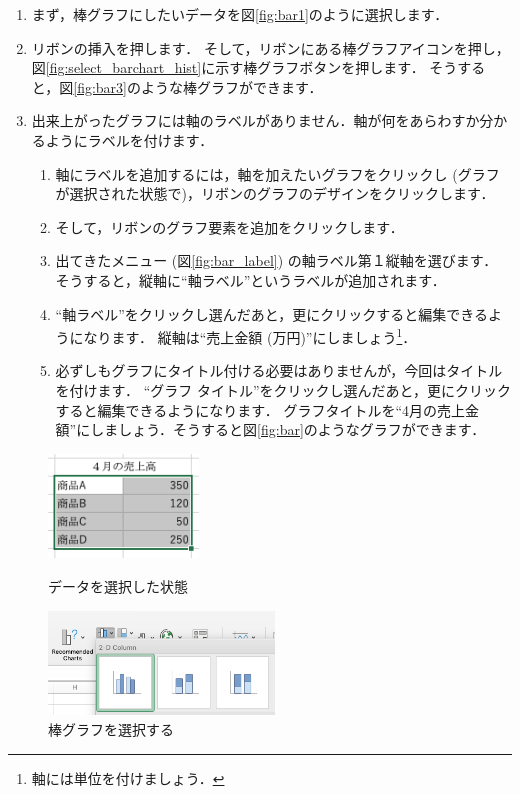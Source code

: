 \begin{enumerate}
    \item まず，棒グラフにしたいデータを図\ref{fig:bar1}のように選択します．
    \item リボンの挿入を押します．
    そして，リボンにある棒グラフアイコンを押し，図\ref{fig:select_barchart_hist}に示す棒グラフボタンを押します．
    そうすると，図\ref{fig:bar3}のような棒グラフができます．
    \item 出来上がったグラフには軸のラベルがありません．軸が何をあらわすか分かるようにラベルを付けます．
    \begin{enumerate}
        \item 軸にラベルを追加するには，軸を加えたいグラフをクリックし (グラフが選択された状態で)，リボンのグラフのデザインをクリックします．
        \item そして，リボンのグラフ要素を追加をクリックします．
        \item 出てきたメニュー (図\ref{fig:bar_label}) の軸ラベル第１縦軸を選びます．
        そうすると，縦軸に``軸ラベル''というラベルが追加されます．
        \item ``軸ラベル''をクリックし選んだあと，更にクリックすると編集できるようになります．
        縦軸は``売上金額 (万円)''にしましょう\footnote{軸には単位を付けましょう．}．
        \item 必ずしもグラフにタイトル付ける必要はありませんが，今回はタイトルを付けます．
        ``グラフ タイトル''をクリックし選んだあと，更にクリックすると編集できるようになります．
        グラフタイトルを``4月の売上金額''にしましょう．そうすると図\ref{fig:bar}のようなグラフができます．
    \end{enumerate}
\end{enumerate}

\begin{figure}[tb]
    \begin{minipage}{0.5\hsize}
        \centering
        \includegraphics[width=4cm]{chap2/bar1.png}
        \caption{データを選択した状態}
        \label{fig:bar1}
    \end{minipage}
    \begin{minipage}{0.5\hsize}
        \centering
        \includegraphics[width=6cm]{chap2/bar2.png}
        \caption{棒グラフを選択する}
        \label{fig:bar2}
    \end{minipage}
\end{figure}

